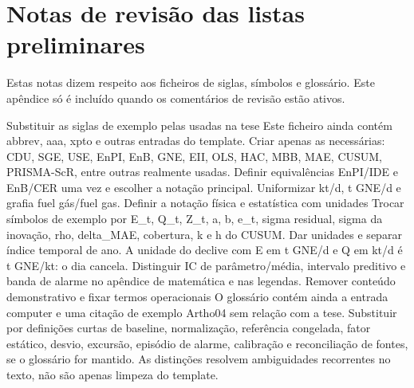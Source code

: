 \chapter{Notas de revisão das listas preliminares}
\label{app:revisao-editorial}

Estas notas dizem respeito aos ficheiros de siglas, símbolos e glossário.
Este apêndice só é incluído quando os comentários de revisão estão ativos.

{Substituir as siglas de exemplo pelas usadas na tese}
{Este ficheiro ainda contém abbrev, aaa, xpto e outras entradas do
template. Criar apenas as necessárias: CDU, SGE, USE, EnPI, EnB, GNE,
EII, OLS, HAC, MBB, MAE, CUSUM, PRISMA-ScR, entre outras realmente usadas.
Definir equivalências EnPI/IDE e EnB/CER uma vez e escolher a notação
principal. Uniformizar kt/d, t GNE/d e grafia fuel gás/fuel gas.}%
{Definir a notação física e estatística com unidades}
{Trocar símbolos de exemplo por E\_t, Q\_t, Z\_t, a, b, e\_t, sigma residual,
sigma da inovação, rho, delta\_MAE, cobertura, k e h do CUSUM.
Dar unidades e separar índice temporal de ano. A unidade do declive
com E em t GNE/d e Q em kt/d é t GNE/kt: o dia cancela.
Distinguir IC de parâmetro/média, intervalo preditivo e banda de alarme
no apêndice de matemática e nas legendas.}%
{Remover conteúdo demonstrativo e fixar termos operacionais}
{O glossário contém ainda a entrada computer e uma citação de exemplo
Artho04 sem relação com a tese. Substituir por definições curtas de
baseline, normalização, referência congelada, fator estático, desvio,
excursão, episódio de alarme, calibração e reconciliação de fontes,
se o glossário for mantido. As distinções resolvem ambiguidades
recorrentes no texto, não são apenas limpeza do template.}%
